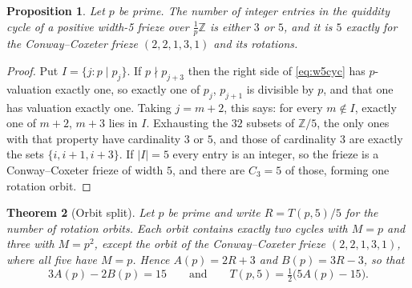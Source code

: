 \documentclass[11pt]{article}
\theoremstyle{plain}
\newtheorem{theorem}{Theorem}[section]
\newtheorem{proposition}[theorem]{Proposition}
\theoremstyle{definition}
\newcommand{\Z}{\mathbb{Z}}
\begin{document}
\begin{proposition}\label{prop:intcount}
Let $p$ be prime. The number of integer entries in the quiddity cycle of a positive
width-5 frieze over $\tfrac1p\Z$ is either $3$ or $5$, and it is $5$ exactly for the
Conway--Coxeter frieze $(2,2,1,3,1)$ and its rotations.
\end{proposition}

\begin{proof}
Put $I=\{j: p\mid p_j\}$. If $p\nmid p_{j+3}$ then the right side of \eqref{eq:w5cyc} has
$p$-valuation exactly one, so exactly one of $p_j$, $p_{j+1}$ is divisible by $p$, and
that one has valuation exactly one. Taking $j=m+2$, this says: for every $m\notin I$,
exactly one of $m+2$, $m+3$ lies in $I$. Exhausting the $32$ subsets of $\Z/5$, the only
ones with that property have cardinality $3$ or $5$, and those of cardinality $3$ are
exactly the sets $\{i,i+1,i+3\}$. If $|I|=5$ every entry is an integer, so the frieze is a
Conway--Coxeter frieze of width $5$, and there are $C_3=5$ of those, forming one rotation
orbit.
\end{proof}

\begin{theorem}[Orbit split]\label{thm:orbit}
Let $p$ be prime and write $R=T(p,5)/5$ for the number of rotation orbits. Each orbit
contains exactly two cycles with $M=p$ and three with $M=p^2$, except the orbit of the
Conway--Coxeter frieze $(2,2,1,3,1)$, where all five have $M=p$. Hence $A(p)=2R+3$ and
$B(p)=3R-3$, so that
\[
  3A(p)-2B(p)=15 \qquad\text{and}\qquad T(p,5)=\tfrac12\bigl(5A(p)-15\bigr).
\]
\end{theorem}
\end{document}
